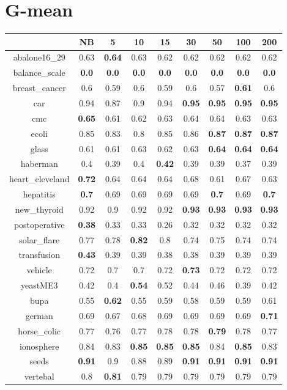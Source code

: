 \documentclass{article}%
\begin{document}
%
\section*{G{-}mean}%
\begin{tabular}{c|cccccccc}%
\hline%
&NB&5&10&15&30&50&100&200\\%
\hline%
abalone16\_29&0.63&\textbf{0.64}&0.63&0.62&0.62&0.62&0.62&0.62\\%
\hline%
balance\_scale&\textbf{0.0}&\textbf{0.0}&\textbf{0.0}&\textbf{0.0}&\textbf{0.0}&\textbf{0.0}&\textbf{0.0}&\textbf{0.0}\\%
\hline%
breast\_cancer&0.6&0.59&0.6&0.59&0.6&0.57&\textbf{0.61}&0.6\\%
\hline%
car&0.94&0.87&0.9&0.94&\textbf{0.95}&\textbf{0.95}&\textbf{0.95}&\textbf{0.95}\\%
\hline%
cmc&\textbf{0.65}&0.61&0.62&0.63&0.64&0.64&0.63&0.63\\%
\hline%
ecoli&0.85&0.83&0.8&0.85&0.86&\textbf{0.87}&\textbf{0.87}&\textbf{0.87}\\%
\hline%
glass&0.61&0.61&0.63&0.62&0.63&\textbf{0.64}&\textbf{0.64}&\textbf{0.64}\\%
\hline%
haberman&0.4&0.39&0.4&\textbf{0.42}&0.39&0.39&0.37&0.39\\%
\hline%
heart\_cleveland&\textbf{0.72}&0.64&0.64&0.64&0.68&0.61&0.67&0.63\\%
\hline%
hepatitis&\textbf{0.7}&0.69&0.69&0.69&0.69&\textbf{0.7}&0.69&\textbf{0.7}\\%
\hline%
new\_thyroid&0.92&0.9&0.92&0.92&\textbf{0.93}&\textbf{0.93}&\textbf{0.93}&\textbf{0.93}\\%
\hline%
postoperative&\textbf{0.38}&0.33&0.33&0.26&0.32&0.32&0.32&0.32\\%
\hline%
solar\_flare&0.77&0.78&\textbf{0.82}&0.8&0.74&0.75&0.74&0.74\\%
\hline%
transfusion&\textbf{0.43}&0.39&0.39&0.38&0.38&0.39&0.39&0.39\\%
\hline%
vehicle&0.72&0.7&0.7&0.72&\textbf{0.73}&0.72&0.72&0.72\\%
\hline%
yeastME3&0.42&0.4&\textbf{0.54}&0.52&0.44&0.46&0.39&0.42\\%
\hline%
bupa&0.55&\textbf{0.62}&0.55&0.59&0.58&0.59&0.59&0.61\\%
\hline%
german&0.69&0.67&0.68&0.69&0.69&0.69&0.69&\textbf{0.71}\\%
\hline%
horse\_colic&0.77&0.76&0.77&0.78&0.78&\textbf{0.79}&0.78&0.77\\%
\hline%
ionosphere&0.84&0.83&\textbf{0.85}&\textbf{0.85}&\textbf{0.85}&0.84&\textbf{0.85}&0.83\\%
\hline%
seeds&\textbf{0.91}&0.9&0.88&0.89&\textbf{0.91}&\textbf{0.91}&\textbf{0.91}&\textbf{0.91}\\%
\hline%
vertebal&0.8&\textbf{0.81}&0.79&0.79&0.79&0.79&0.79&0.79\\%
\hline%
\end{tabular}

%
\end{document}
